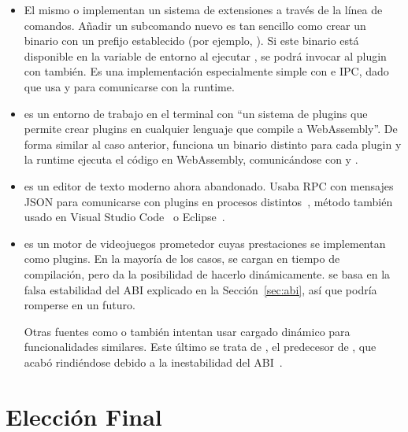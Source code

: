 \begin{itemize}
    \item El mismo  o  implementan un sistema
        de extensiones a través de la línea de comandos. Añadir un subcomando
        nuevo es tan sencillo como crear un binario con un prefijo establecido
        (por ejemplo, ). Si este binario está disponible en
        la variable de entorno  al ejecutar , se podrá
        invocar al plugin con  también. Es una implementación
        especialmente simple con \pipes e IPC, dado que usa \stdin y \stdout
        para comunicarse con la runtime.

    \item {} es un entorno de trabajo en el terminal con ``un
        sistema de plugins que permite crear plugins en cualquier lenguaje que
        compile a WebAssembly''. De forma similar al caso anterior, funciona un
        binario distinto para cada plugin y la runtime ejecuta el código en
        WebAssembly, comunicándose con \stdin y \stdout.

    \item {} es un editor de texto moderno ahora abandonado. Usaba
        RPC con mensajes JSON para comunicarse con plugins en procesos
        distintos~\cite{xiplugin}, método también usado en Visual Studio
        Code~\cite{vscodeplugin} o Eclipse~\cite{eclipseplugin}.

    \item {} es un motor de videojuegos prometedor cuyas
        prestaciones se implementan como plugins. En la mayoría de los casos, se
        cargan en tiempo de compilación, pero  da la
        posibilidad de hacerlo dinámicamente.  se basa en la falsa
        estabilidad del ABI explicado en la Sección~\ref{sec:abi}, así que
        podría romperse en un futuro.

        Otras fuentes como \textcite{dynloading1} o \textcite{dynloading2}
        también intentan usar cargado dinámico para funcionalidades similares.
        Este último se trata de , el predecesor de
        , que acabó rindiéndose debido a la inestabilidad del
        ABI~\cite{dynloading_giveup1}\cite{dynloading_giveup2}.

\end{itemize}

\section{Elección Final}

